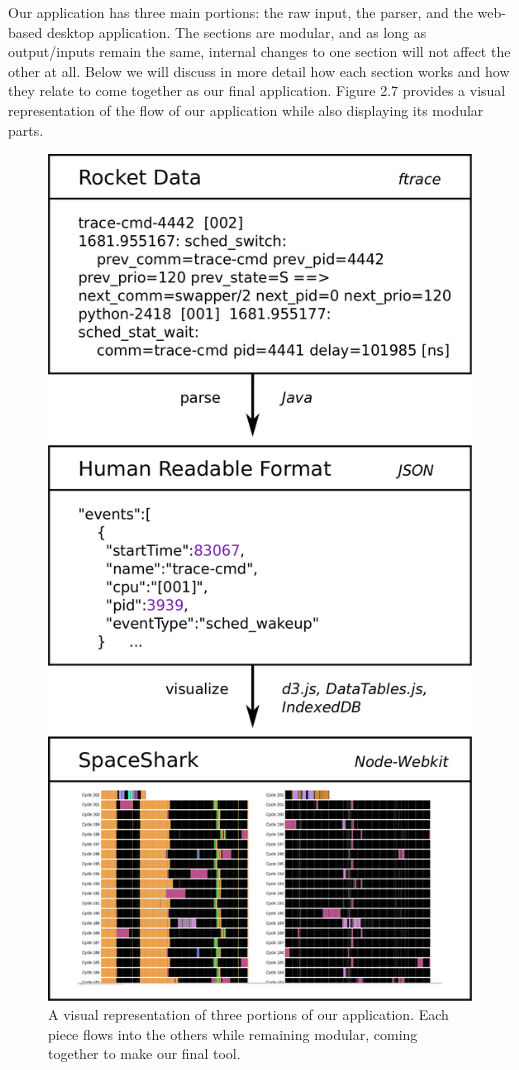\documentclass{hmcclinic}
\begin{document}
  Our application has three main portions: the raw input, the parser,
  and the web-based desktop application. The sections are modular, and
  as long as output/inputs remain the same, internal changes to one section will
  not affect the other at all. Below we will discuss in more detail how each
  section works and how they relate to come together as our final application.
  Figure 2.7 provides a visual representation of the flow of our application
  while also displaying its modular parts.
  
  \begin{figure}[H]
    \begin{center}
  \includegraphics[scale=0.18]{architecture_diagram.png}
  \caption{A visual representation of three portions of our application. Each
  piece flows into the others while remaining modular, coming together to make our final tool.}
\end{center}
\end{figure}
\end{document}
